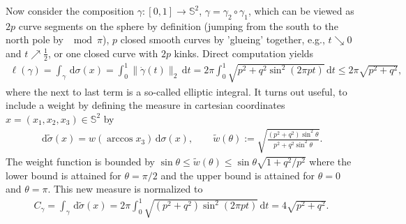 \documentclass[11pt,a4paper,twoside,final,biblatex]{scrartcl}
\renewcommand{\S}{\ensuremath{\mathbb{S}}}
\renewcommand{\d}{\,\mathrm{d}}
\theoremstyle{definition}
\numberwithin{equation}{section}
\numberwithin{table}{section}
\numberwithin{figure}{section}
\begin{document}
 Now consider the composition $\gamma:[0,1]\to\S^2$, $\gamma=\gamma_2\circ\gamma_1$, which can be viewed as $2p$ curve segments on the sphere by definition (jumping from the south to the north pole by $\mod \pi$), $p$ closed smooth curves by 'glueing' together, e.g., $t\searrow 0$ and $t\nearrow \frac12$, or one closed curve with $2p$ kinks.
 Direct computation yields
 \begin{align*}
     \ell(\gamma)
     =\int_\gamma \d \sigma(x)
     =\int_0^1 \|\dot\gamma(t)\|_2\d t
     =2\pi\int_0^1 \sqrt{p^2+q^2\sin^2(2\pi p t)}\d t
     \le 2\pi\sqrt{p^2+q^2},
 \end{align*}
 where the next to last term is a so-called elliptic integral.
 It turns out useful, to include a weight by defining the measure in cartesian coordinates $x=(x_1,x_2,x_3)\in\S^2$ by
 \begin{align*}
  \d\tilde\sigma(x)=w(\arccos{x_3})\d\sigma(x),\qquad
  \tilde w(\theta):=\sqrt{\frac{(p^2+q^2)\sin^2\theta}{p^2+q^2\sin^2\theta}}.
 \end{align*}
 The weight function is bounded by $\sin\theta\le \tilde w(\theta)\le \sin\theta\sqrt{1+q^2/p^2}$ where the lower bound is attained for $\theta=\pi/2$ and the upper bound is attained for $\theta=0$ and $\theta=\pi$.
 This new measure is normalized to
 \begin{align*}
  C_{\gamma}=\int_{\gamma}\d\tilde\sigma(x)=2\pi\int_0^1 \sqrt{(p^2+q^2)\sin^2(2\pi pt)}\d t
  =4\sqrt{p^2+q^2}.
 \end{align*}
\end{document}

